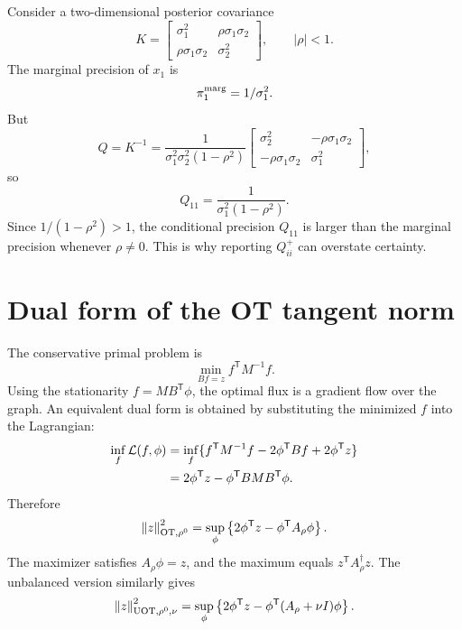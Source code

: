 \documentclass[11pt]{article}
\numberwithin{equation}{section}
\newcommand{\transpose}{^{\mathsf T}}
\newcommand{\pinv}{^{\dagger}}
\newcommand{\norm}[1]{\left\lVert #1\right\rVert}
\begin{document}
Consider a two-dimensional posterior covariance
\begin{equation}
  K=\begin{bmatrix}
    \sigma_1^2&\rho\sigma_1\sigma_2\\
    \rho\sigma_1\sigma_2&\sigma_2^2
  \end{bmatrix},
  \qquad |\rho|<1.
  \label{eq:two-var-cov}
\end{equation}
The marginal precision of $x_1$ is
\begin{equation}
  \pi_1^{\rm marg}=1/\sigma_1^2.
  \label{eq:marginal-two}
\end{equation}
But
\begin{equation}
  Q=K^{-1}
  =\frac{1}{\sigma_1^2\sigma_2^2(1-\rho^2)}
  \begin{bmatrix}
    \sigma_2^2&-\rho\sigma_1\sigma_2\\
    -\rho\sigma_1\sigma_2&\sigma_1^2
  \end{bmatrix},
  \label{eq:two-var-precision}
\end{equation}
so
\begin{equation}
  Q_{11}=\frac{1}{\sigma_1^2(1-\rho^2)}.
  \label{eq:conditional-two}
\end{equation}
Since $1/(1-\rho^2)>1$, the conditional precision $Q_{11}$ is larger than the marginal precision whenever $\rho\ne0$.  This is why reporting $Q^+_{ii}$ can overstate certainty.

\section{Dual form of the OT tangent norm}
\label{app:ot-dual}

The conservative primal problem is
\[
  \min_{Bf=z} f\transpose M^{-1}f.
\]
Using the stationarity $f=MB\transpose\phi$, the optimal flux is a gradient flow over the graph.  An equivalent dual form is obtained by substituting the minimized $f$ into the Lagrangian:
\begin{align}
  \inf_f\mathcal L(f,\phi)
  &=\inf_f\{f\transpose M^{-1}f-2\phi\transpose Bf+2\phi\transpose z\}\notag\\
  &=2\phi\transpose z-\phi\transpose BMB\transpose\phi.
  \label{eq:ot-dual-derivation}
\end{align}
Therefore
\begin{equation}
  \norm{z}_{\rm OT,\rho^0}^2
  =\sup_{\phi}\left\{2\phi\transpose z-\phi\transpose A_\rho\phi\right\}.
  \label{eq:ot-dual}
\end{equation}
The maximizer satisfies $A_\rho\phi=z$, and the maximum equals $z\transpose A_\rho\pinv z$.  The unbalanced version similarly gives
\begin{equation}
  \norm{z}_{\rm UOT,\rho^0,\nu}^2
  =\sup_{\phi}\left\{2\phi\transpose z-\phi\transpose(A_\rho+\nu I)\phi\right\}.
  \label{eq:uot-dual}
\end{equation}
\end{document}
